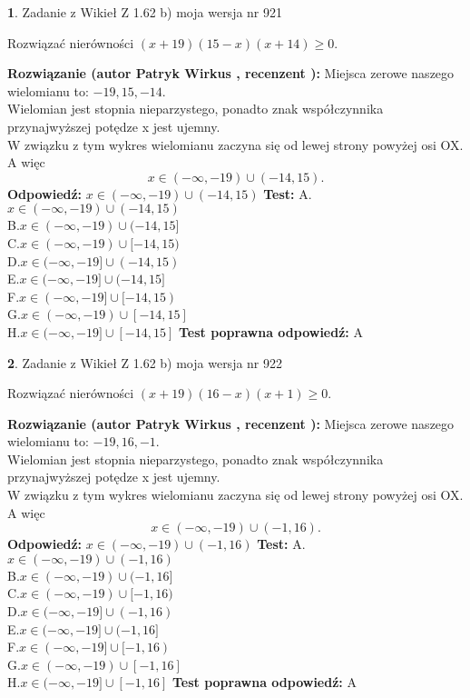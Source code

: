 \documentclass[12pt, a4paper]{article}
\theoremstyle{definition} %
\newtheorem{zad}{}
\newcommand{\zadStart}[1]{\begin{zad}#1\newline}
\newcommand{\zadStop}{\end{zad}}
\newcommand{\rozwStart}[2]{\noindent \textbf{Rozwiązanie (autor #1 , recenzent #2): }\newline}
\newcommand{\rozwStop}{\newline}
\newcommand{\odpStart}{\noindent \textbf{Odpowiedź:}\newline}
\newcommand{\odpStop}{\newline}
\newcommand{\testStart}{\noindent \textbf{Test:}\newline}
\newcommand{\testStop}{\newline}
\newcommand{\kluczStart}{\noindent \textbf{Test poprawna odpowiedź:}\newline}
\newcommand{\kluczStop}{\newline}
\begin{document}
\zadStart{Zadanie z Wikieł Z 1.62 b) moja wersja nr 921}

Rozwiązać nierówności $(x+19)(15-x)(x+14)\ge0$.
\zadStop
\rozwStart{Patryk Wirkus}{}
Miejsca zerowe naszego wielomianu to: $-19, 15, -14$.\\
Wielomian jest stopnia nieparzystego, ponadto znak współczynnika przy\linebreak najwyższej potędze x jest ujemny.\\ W związku z tym wykres wielomianu zaczyna się od lewej strony powyżej osi OX. A więc $$x \in (-\infty,-19) \cup (-14,15).$$
\rozwStop
\odpStart
$x \in (-\infty,-19) \cup (-14,15)$
\odpStop
\testStart
A.$x \in (-\infty,-19) \cup (-14,15)$\\
B.$x \in (-\infty,-19) \cup (-14,15]$\\
C.$x \in (-\infty,-19) \cup [-14,15)$\\
D.$x \in (-\infty,-19] \cup (-14,15)$\\
E.$x \in (-\infty,-19] \cup (-14,15]$\\
F.$x \in (-\infty,-19] \cup [-14,15)$\\
G.$x \in (-\infty,-19) \cup [-14,15]$\\
H.$x \in (-\infty,-19] \cup [-14,15]$
\testStop
\kluczStart
A
\kluczStop



\zadStart{Zadanie z Wikieł Z 1.62 b) moja wersja nr 922}

Rozwiązać nierówności $(x+19)(16-x)(x+1)\ge0$.
\zadStop
\rozwStart{Patryk Wirkus}{}
Miejsca zerowe naszego wielomianu to: $-19, 16, -1$.\\
Wielomian jest stopnia nieparzystego, ponadto znak współczynnika przy\linebreak najwyższej potędze x jest ujemny.\\ W związku z tym wykres wielomianu zaczyna się od lewej strony powyżej osi OX. A więc $$x \in (-\infty,-19) \cup (-1,16).$$
\rozwStop
\odpStart
$x \in (-\infty,-19) \cup (-1,16)$
\odpStop
\testStart
A.$x \in (-\infty,-19) \cup (-1,16)$\\
B.$x \in (-\infty,-19) \cup (-1,16]$\\
C.$x \in (-\infty,-19) \cup [-1,16)$\\
D.$x \in (-\infty,-19] \cup (-1,16)$\\
E.$x \in (-\infty,-19] \cup (-1,16]$\\
F.$x \in (-\infty,-19] \cup [-1,16)$\\
G.$x \in (-\infty,-19) \cup [-1,16]$\\
H.$x \in (-\infty,-19] \cup [-1,16]$
\testStop
\kluczStart
A
\kluczStop
\end{document}
